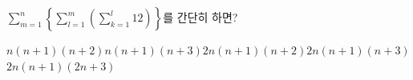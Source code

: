 $\displaystyle\sum_{m=1}^{n}\left\{\sum_{l=1}^{m}\left(\sum_{k=1}^{l} 12\right)\right\}$를 간단히 하면?
\begin{choicesii}{$n(n+1)(n+2)$}{$n(n+1)(n+3)$}{$2n(n+1)(n+2)$}{$2n(n+1)(n+3)$}{$2n(n+1)(2n+3)$}\end{choicesii}
